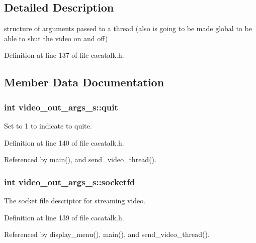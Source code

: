 \subsection{\-Detailed \-Description}
structure of arguments passed to a thread (also is going to be made global to be able to shut the video on and off) 

\-Definition at line 137 of file cacatalk.\-h.



\subsection{\-Member \-Data \-Documentation}
\hypertarget{structvideo__out__args__s_a3ccef1d0e1be0c01d38e75a4303fc46d}{
\subsubsection[{quit}]{\setlength{\rightskip}{0pt plus 5cm}int {\bf video\-\_\-out\-\_\-args\-\_\-s\-::quit}}}\label{structvideo__out__args__s_a3ccef1d0e1be0c01d38e75a4303fc46d}


\-Set to 1 to indicate to quite. 



\-Definition at line 140 of file cacatalk.\-h.



\-Referenced by main(), and send\-\_\-video\-\_\-thread().

\hypertarget{structvideo__out__args__s_aaf0a67c5a877ce3505ad692e62f40b27}{
\subsubsection[{socketfd}]{\setlength{\rightskip}{0pt plus 5cm}int {\bf video\-\_\-out\-\_\-args\-\_\-s\-::socketfd}}}\label{structvideo__out__args__s_aaf0a67c5a877ce3505ad692e62f40b27}


\-The socket file descriptor for streaming video. 



\-Definition at line 139 of file cacatalk.\-h.



\-Referenced by display\-\_\-menu(), main(), and send\-\_\-video\-\_\-thread().

